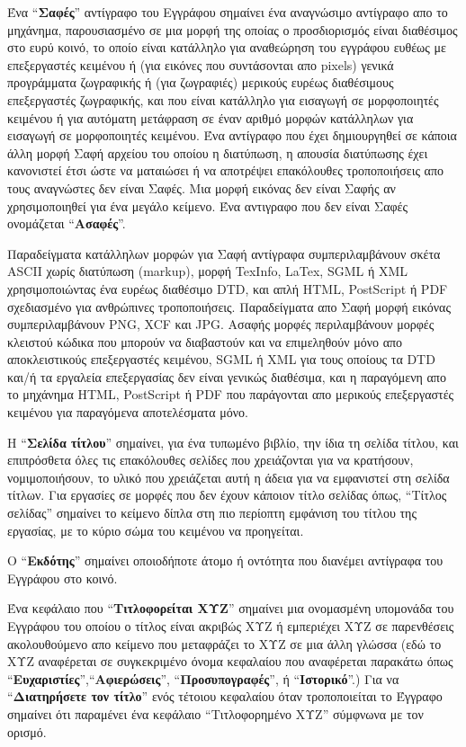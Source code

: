 Ένα ``\textbf{Σαφές}'' αντίγραφο του Εγγράφου σημαίνει ένα αναγνώσιμο αντίγραφο απο το μηχάνημα, παρουσιασμένο σε μια μορφή της οποίας ο προσδιορισμός είναι διαθέσιμος στο ευρύ κοινό, το οποίο είναι κατάλληλο για αναθεώρηση του εγγράφου ευθέως με επεξεργαστές κειμένου ή (για εικόνες που συντάσονται απο pixels) γενικά προγράμματα ζωγραφικής ή (για ζωγραφιές) μερικούς ευρέως διαθέσιμους επεξεργαστές ζωγραφικής, και που είναι κατάλληλο για εισαγωγή σε μορφοποιητές κειμένου ή για αυτόματη μετάφραση σε έναν αριθμό μορφών κατάλληλων για εισαγωγή σε μορφοποιητές κειμένου. Ένα αντίγραφο που έχει δημιουργηθεί σε κάποια άλλη μορφή Σαφή αρχείου του οποίου η διατύπωση, η απουσία διατύπωσης έχει κανονιστεί έτσι ώστε να ματαιώσει ή να αποτρέψει επακόλουθες τροποποιήσεις απο τους αναγνώστες δεν είναι Σαφές. Μια μορφή εικόνας δεν είναι Σαφής αν χρησιμοποιηθεί για ένα μεγάλο κείμενο. Ένα αντιγραφο που δεν είναι Σαφές ονομάζεται ``\textbf{Ασαφές}''.

Παραδείγματα κατάλληλων μορφών για Σαφή αντίγραφα συμπεριλαμβάνουν σκέτα ASCII χωρίς διατύπωση (markup), μορφή TexInfo, LaTex, SGML ή XML χρησιμοποιώντας ένα ευρέως διαθέσιμο DTD, και απλή HTML, PostScript ή PDF σχεδιασμένο για ανθρώπινες τροποποιήσεις. Παραδείγματα απο Σαφή μορφή εικόνας συμπεριλαμβάνουν PNG, XCF και JPG. Ασαφής μορφές περιλαμβάνουν μορφές κλειστού κώδικα που μπορούν να διαβαστούν και να επιμεληθούν μόνο απο αποκλειστικούς επεξεργαστές κειμένου, SGML ή XML για τους οποίους τα DTD και/ή τα εργαλεία επεξεργασίας δεν είναι γενικώς διαθέσιμα, και η παραγόμενη απο το μηχάνημα HTML, PostScript ή PDF που παράγονται απο μερικούς επεξεργαστές κειμένου για παραγόμενα αποτελέσματα μόνο.

H ``\textbf{Σελίδα τίτλου}'' σημαίνει, για ένα τυπωμένο βιβλίο, την ίδια τη σελίδα τίτλου, και επιπρόσθετα όλες τις επακόλουθες σελίδες που χρειάζονται για να κρατήσουν, νομιμοποιήσουν, το υλικό που χρειάζεται αυτή η άδεια για να εμφανιστεί στη σελίδα τίτλων. Για εργασίες σε μορφές που δεν έχουν κάποιον τίτλο σελίδας όπως, “Τίτλος σελίδας” σημαίνει το κείμενο δίπλα στη πιο περίοπτη εμφάνιση του τίτλου της εργασίας, με το κύριο σώμα του κειμένου να προηγείται.

Ο ``\textbf{Εκδότης}'' σημαίνει οποιοδήποτε άτομο ή οντότητα που διανέμει αντίγραφα του Εγγράφου στο κοινό. 

Ένα κεφάλαιο που  ``\textbf{Τιτλοφορείται ΧΥΖ}'' σημαίνει μια ονομασμένη υπομονάδα του Εγγράφου του οποίου ο τίτλος είναι ακριβώς ΧΥΖ ή εμπεριέχει ΧΥΖ σε παρενθέσεις ακολουθούμενο απο κείμενο που μεταφράζει το ΧΥΖ σε μια άλλη γλώσσα (εδώ το ΧΥΖ αναφέρεται σε συγκεκριμένο όνομα κεφαλαίου που αναφέρεται παρακάτω όπως  ``\textbf{Ευχαριστίες}'',``\textbf{Αφιερώσεις}'', ``\textbf{Προσυπογραφές}'', ή ``\textbf{Ιστορικό}''.)  
Για να ``\textbf{Διατηρήσετε τον τίτλο}''
ενός τέτοιου κεφαλαίου όταν τροποποιείται το Έγγραφο  σημαίνει ότι παραμένει ένα κεφάλαιο “Τιτλοφορημένο ΧΥΖ” σύμφνωνα με τον ορισμό.

